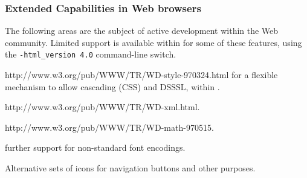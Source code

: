 \subsubsection*{Extended Capabilities in Web browsers}
The following areas are the subject of active development
within the Web community. 
Limited support is available within \latextohtml{} for some of these features,
using the \texttt{-html\_version 4.0} command-line switch.
\begin{description}
%
%
%
\item [style-sheets: ] %
{http://www.w3.org/pub/WWW/TR/WD-style-970324.html}
for a flexible mechanism to allow cascading (CSS) and DSSSL, 
within .
%
%
%
\item [XML: ] %
{http://www.w3.org/pub/WWW/TR/WD-xml.html}.

%
%
\item [MathML: ] %
{http://www.w3.org/pub/WWW/TR/WD-math-970515}.

%
\item [Fonts: ] further support for non-standard font encodings.

%
\item [Icons: ] Alternative sets of icons for navigation buttons 
and other purposes.
\end{description}



\endinput















